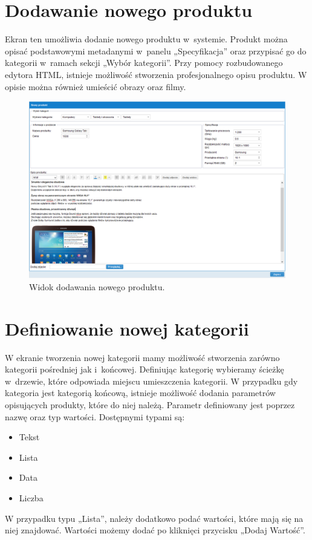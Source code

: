 \newpage
\section{Dodawanie nowego produktu}

Ekran ten umożliwia dodanie nowego produktu w~systemie. Produkt można opisać podstawowymi metadanymi w~panelu „Specyfikacja” oraz przypisać go do kategorii w~ramach sekcji „Wybór kategorii”. Przy pomocy rozbudowanego edytora HTML, istnieje możliwość stworzenia profesjonalnego opisu produktu. W opisie można również umieścić obrazy oraz filmy.

\begin{figure}[h]
	\centering
	\includegraphics[width=1.00\textwidth]{images/nowy_produkt.PNG}
	\caption{Widok dodawania nowego produktu.}
\end{figure}

\section{Definiowanie nowej kategorii}

W ekranie tworzenia nowej kategorii mamy możliwość stworzenia zarówno kategorii pośredniej jak i~końcowej. Definiując kategorię wybieramy ścieżkę w~drzewie, które odpowiada miejscu umieszczenia kategorii. W przypadku gdy kategoria jest kategorią końcową, istnieje możliwość dodania parametrów opisujących produkty, które do niej należą. Parametr definiowany jest poprzez nazwę oraz typ wartości. Dostępnymi typami są:
\begin{itemize}
\item Tekst
\item Lista
\item Data
\item Liczba
\end{itemize}
W przypadku typu „Lista”, należy dodatkowo podać wartości, które mają się na niej znajdować. Wartości  możemy dodać po kliknięci przycisku „Dodaj Wartość”.

